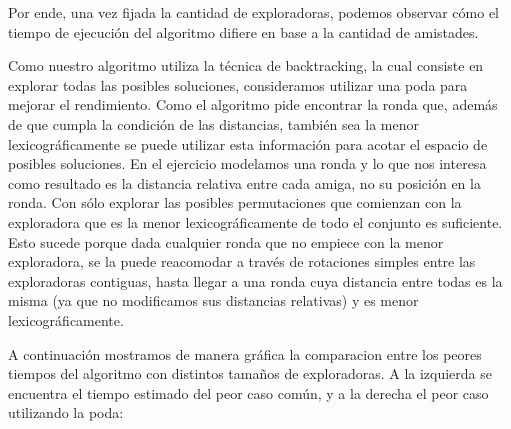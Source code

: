 \documentclass[spanish,a4paper]{article}
\begin{document}
Por ende, una vez fijada la cantidad de exploradoras, podemos observar cómo el tiempo de ejecución del algoritmo 
difiere en base a la cantidad de amistades. 

Como nuestro algoritmo utiliza la técnica de backtracking, la cual consiste en explorar todas las posibles 
soluciones, consideramos utilizar una poda para mejorar el rendimiento. Como el algoritmo pide 
encontrar la ronda que, además de que cumpla la condición de las distancias, también sea la menor lexicográficamente 
se puede utilizar esta información para acotar el espacio de posibles soluciones. En el ejercicio modelamos 
una ronda y lo que nos interesa como resultado es la distancia relativa entre cada amiga, no su posición en la ronda. 
Con sólo explorar las posibles permutaciones que comienzan con la exploradora que es la menor lexicográficamente 
de todo el conjunto es suficiente. Esto sucede porque dada cualquier ronda que no empiece con la menor exploradora, 
se la puede reacomodar a través de rotaciones simples entre las exploradoras contiguas, hasta llegar a una ronda 
cuya distancia entre todas es la misma (ya que no modificamos sus distancias relativas) y es menor lexicográficamente.

A continuación mostramos de manera gráfica la comparacion entre los peores tiempos del algoritmo con distintos tamaños de exploradoras.
A la izquierda se encuentra el tiempo estimado del peor caso común, y a la derecha el peor caso utilizando la poda:
\end{document}
